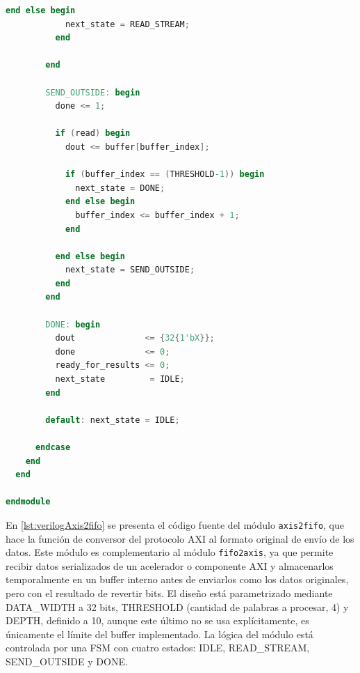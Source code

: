 \begin{lstlisting}[language=verilog,frame=single,caption={Código fuente en Verilog del módulo conversor de AXI al formato de datos origen},showstringspaces=false,label=lst:verilogAxis2fifo]
          end else begin
            next_state = READ_STREAM;
          end
          
        end

        SEND_OUTSIDE: begin
          done <= 1;
          
          if (read) begin
            dout <= buffer[buffer_index];

            if (buffer_index == (THRESHOLD-1)) begin 
              next_state = DONE;
            end else begin
              buffer_index <= buffer_index + 1;
            end
            
          end else begin
          	next_state = SEND_OUTSIDE;
          end
        end

        DONE: begin
          dout              <= {32{1'bX}};
          done              <= 0;
	      ready_for_results <= 0;
          next_state         = IDLE;
        end

        default: next_state = IDLE;
        
      endcase
    end
  end

endmodule
\end{lstlisting}

En \ref{lst:verilogAxis2fifo} se presenta el código fuente del módulo \texttt{axis2fifo}, que hace la función de conversor del protocolo AXI al formato original de envío de los datos. Este módulo es complementario al módulo \texttt{fifo2axis}, ya que permite recibir datos serializados de un acelerador o componente AXI y almacenarlos temporalmente en un buffer interno antes de enviarlos como los datos originales, pero con el resultado de revertir bits. El diseño está parametrizado mediante DATA\_WIDTH a 32 bits, THRESHOLD (cantidad de palabras a procesar, 4) y DEPTH, definido a  10, aunque este último no se usa explícitamente, es únicamente el límite del buffer implementado. La lógica del módulo está controlada por una FSM con cuatro estados: IDLE, READ\_STREAM, SEND\_OUTSIDE y DONE.

